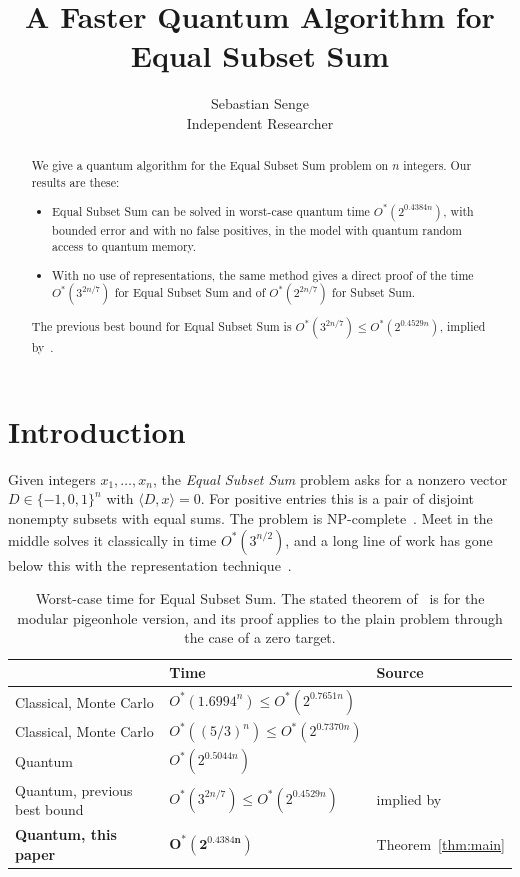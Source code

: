 \documentclass[11pt]{article}
\title{A Faster Quantum Algorithm for Equal Subset Sum}
\author{Sebastian Senge\\ Independent Researcher}
\date{}
\theoremstyle{remark}
\newcommand{\ip}[2]{\langle #1,#2\rangle}
\begin{document}
\maketitle

\begin{abstract}
We give a quantum algorithm for the Equal Subset Sum problem on $n$ integers. Our results are these:
\begin{itemize}[leftmargin=1.5em]
\item Equal Subset Sum can be solved in worst-case quantum time $O^*(2^{0.4384n})$, with bounded error and with no false positives, in the model with quantum random access to quantum memory.
\item With no use of representations, the same method gives a direct proof of the time $O^*(3^{2n/7})$ for Equal Subset Sum and of $O^*(2^{2n/7})$ for Subset Sum.
\end{itemize}
The previous best bound for Equal Subset Sum is $O^*(3^{2n/7})\le O^*(2^{0.4529n})$, implied by~\cite{CKLM26}.
\end{abstract}

\section{Introduction}

Given integers $x_1,\dots,x_n$, the \emph{Equal Subset Sum} problem asks for a nonzero vector $D\in\{-1,0,1\}^n$ with $\ip Dx=0$. For positive entries this is a pair of disjoint nonempty subsets with equal sums. The problem is NP-complete~\cite{WY92}. Meet in the middle solves it classically in time $O^*(3^{n/2})$, and a long line of work has gone below this with the representation technique~\cite{MNPW19,RW26,YS26,Ye26}.

\begin{table}[h]
\centering
\small
\renewcommand{\arraystretch}{1.25}
\begin{tabular}{@{}lll@{}}
\toprule
& Time & Source\\
\midrule
Classical, Monte Carlo & $O^*(1.6994^n)\le O^*(2^{0.7651n})$ & \cite{YS26}\\
Classical, Monte Carlo & $O^*((5/3)^n)\le O^*(2^{0.7370n})$ & \cite{Ye26}\\
Quantum & $O^*(2^{0.5044n})$ & \cite{AHJKS22}\\
Quantum, previous best bound & $O^*(3^{2n/7})\le O^*(2^{0.4529n})$ & implied by~\cite{CKLM26}\\
\textbf{Quantum, this paper} & $\mathbf{O^*(2^{0.4384n})}$ & Theorem~\ref{thm:main}\\
\bottomrule
\end{tabular}
\caption{Worst-case time for Equal Subset Sum. The stated theorem of~\cite{CKLM26} is for the modular pigeonhole version, and its proof applies to the plain problem through the case of a zero target.}
\label{tab:results}
\end{table}
\end{document}
